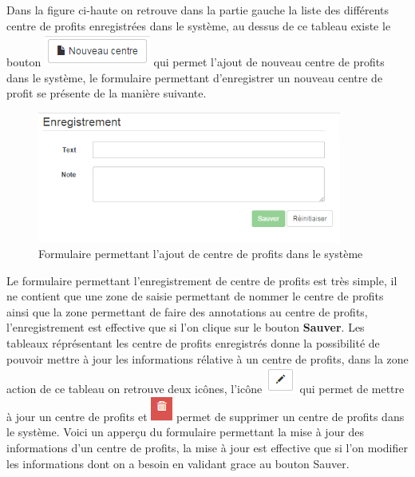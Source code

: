 \documentclass[12pt,a4paper]{report}
\begin{document}
Dans la figure ci-haute on retrouve dans la partie gauche la liste des différents centre de profits enregistrées dans le système, au dessus de ce tableau existe le bouton \includegraphics[scale=1]{pic/NewCostCenter.png} qui permet l'ajout de nouveau centre de profits dans le système, le formulaire permettant d'enregistrer un nouveau centre de profit se présente de la manière suivante.

\begin{figure}[h]
\begin{center}
\includegraphics[width=10cm]{pic/SaveProfitCenter.png}
\end{center}
\caption{Formulaire permettant l'ajout de centre de profits dans le système}
\label{Formulaire permettant l'ajout de centre de profits dans le système}
\end{figure}

Le formulaire permettant l'enregistrement de centre de profits est très simple, il ne contient que une zone de saisie permettant de nommer le centre de profits ainsi que la zone permettant de faire des annotations au centre de profits, l'enregistrement est effective que si l'on clique sur le bouton \textbf{Sauver}. 
\newpage
Les tableaux réprésentant les centre de profits enregistrés donne la possibilité de pouvoir mettre à jour les informations rélative à un centre de profits, dans la zone action de ce tableau on retrouve deux icônes, l'icône \includegraphics[scale=0.7]{pic/EditBlack.png} qui permet de mettre à jour un centre de profits et \includegraphics[scale=0.7]{pic/RecycleRed.png} permet de supprimer un centre de profits dans le système.
Voici un apperçu du formulaire permettant la mise à jour des informations d'un centre de profits, la mise à jour est effective que si l'on modifier les informations dont on a besoin en validant grace au bouton Sauver. 
\end{document}
